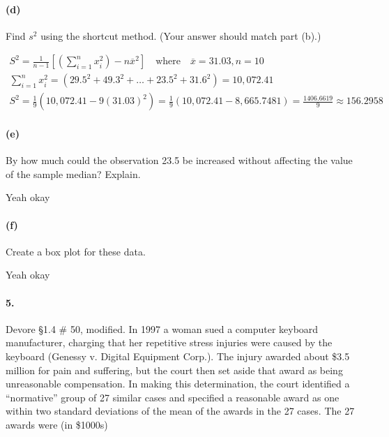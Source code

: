     \paragraph*{(d)}
    Find $s^2$ using the shortcut method. (Your answer should match part (b).)
    
    \begin{mdframed}
        \begin{equation*}
            \begin{gathered}
                S^2 = \frac{1}{n-1}\left[\left(\sum_{i=1}^{n}x_{i}^{2}\right)-n\overline{x}^{2}\right] \quad \text{where} \quad \overline{x}=31.03, n = 10 \\
                \sum_{i=1}^{n}x_{i}^{2} = (29.5^2 + 49.3^2 + \dots + 23.5^2 + 31.6^2) = 10,072.41   \\
                S^2 = \frac{1}{9}\left(10,072.41 - 9(31.03)^2\right) = \frac{1}{9}\left(10,072.41 - 8,665.7481\right)  = \frac{1406.6619}{9} \approx \boxed{156.2958}
            \end{gathered}
        \end{equation*}
    \end{mdframed}

    \paragraph*{(e)}
    By how much could the observation 23.5 be increased without affecting the value of the sample median? Explain.
    
    \begin{mdframed}
        Yeah okay
    \end{mdframed}

    \paragraph*{(f)}
    Create a box plot for these data.

    \begin{mdframed}
        Yeah okay
    \end{mdframed}

    \paragraph*{5.}
    Devore \S1.4 \# 50, modified. In 1997 a woman sued a computer keyboard manufacturer, charging that her repetitive stress injuries were caused by the keyboard (Genessy v. Digital Equipment Corp.). The injury awarded about \$3.5 million for pain and suffering, but the court then set aside that award as being unreasonable compensation. In making this determination, the court identified a “normative” group of 27 similar cases and specified a reasonable award as one within two standard deviations of the mean of the awards in the 27 cases. The 27 awards were (in \$1000s) 
    
